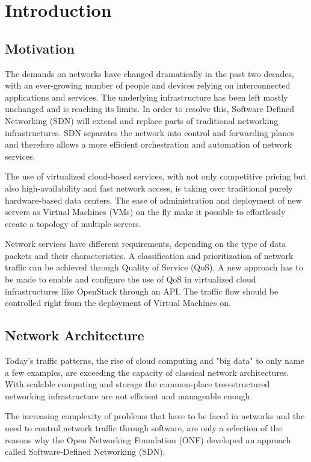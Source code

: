 \chapter{Introduction}
\label{chapter_introduction}



\section{Motivation}

The demands on networks have changed dramatically in the past two decades, with an ever-growing number of people and devices relying on interconnected applications and services. The underlying infrastructure has been left mostly unchanged and is reaching its limits. In order to resolve this, Software Defined Networking (SDN) will extend and replace parts of traditional networking infrastructures. SDN separates the network into control and forwarding planes and therefore allows a more efficient orchestration and automation of network services.

The use of virtualized cloud-based services, with not only competitive pricing but also high-availability and fast network access,  is taking over traditional purely hardware-based data centers. The ease of administration and deployment of new servers as Virtual Machines (VMs) on the fly make it possible to effortlessly create a topology of multiple servers.

Network services have different requirements, depending on the type of data packets and their characteristics. A classification and prioritization of network traffic can be achieved through Quality of Service (QoS). A new approach has to be made to enable and configure the use of QoS in virtualized cloud infrastructures like OpenStack through an API. The traffic flow should be controlled right from the deployment of Virtual Machines on.


\section{Network Architecture}
Today's traffic patterns, the rise of cloud computing and "big data" to only name a few examples, are exceeding the capacity of classical network architectures. With scalable computing and storage the common-place tree-structured networking infrastructure are not efficient and manageable enough. 

The increasing complexity of problems that have to be faced in networks and the need to control network traffic through software, are only a selection of the reasons why the Open Networking Foundation (ONF) developed an approach called Software-Defined Networking (SDN).

